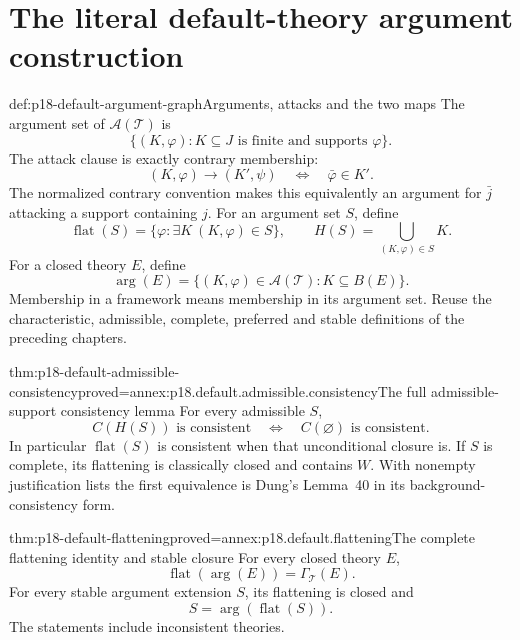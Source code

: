 \section{The literal default-theory argument construction}

\begin{hbdefinition}{def:p18-default-argument-graph}{Arguments, attacks and the two maps}
The argument set of \(\mathcal A(\mathcal T)\) is
\[
          \{(K,\varphi):K\subseteq J\text{ is finite and supports }\varphi\}.
\]
The attack clause is exactly contrary membership:
\[
                (K,\varphi)\to(K',\psi)
                                \quad\Longleftrightarrow\quad\bar\varphi\in K'.
\]
The normalized contrary convention makes this
equivalently an argument for \(\bar j\) attacking
a support containing \(j\).
For an argument set \(S\), define
\[
 \operatorname{flat}(S)=\{\varphi:\exists K\ (K,\varphi)\in S\},
 \qquad H(S)=\bigcup_{(K,\varphi)\in S}K.
\]
For a closed theory \(E\), define
\[
 \operatorname{arg}(E)=
       \{(K,\varphi)\in\mathcal A(\mathcal T):K\subseteq B(E)\}.
\]
Membership in a framework means membership in
its argument set. Reuse the characteristic,
admissible, complete, preferred and stable
definitions of the preceding chapters.
\end{hbdefinition}

\begin{hblemma}{thm:p18-default-admissible-consistency}{proved=annex:p18.default.admissible.consistency}{The full admissible-support consistency lemma}
For every admissible \(S\),
\[
          C(H(S))\text{ is consistent}
                     \quad\Longleftrightarrow\quad C(\varnothing)\text{ is consistent}.
\]
In particular \(\operatorname{flat}(S)\) is
consistent when that unconditional closure is.
If \(S\) is complete, its flattening is
classically closed and contains \(W\).
With nonempty justification lists the first
equivalence is Dung's Lemma~40 in its
background-consistency form.
\end{hblemma}

\begin{hblemma}{thm:p18-default-flattening}{proved=annex:p18.default.flattening}{The complete flattening identity and stable closure}
For every closed theory \(E\),
\[
               \operatorname{flat}(\operatorname{arg}(E))
                                     =\Gamma_{\mathcal T}(E).
\]
For every stable argument extension \(S\),
its flattening is closed and
\[
                       S=\operatorname{arg}(\operatorname{flat}(S)).
\]
The statements include inconsistent theories.
\end{hblemma}

